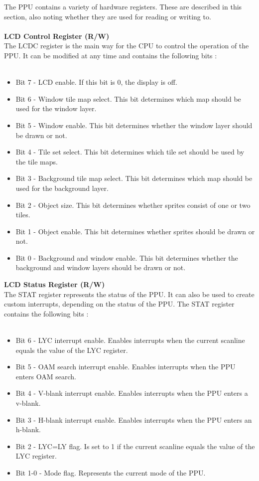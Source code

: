 The PPU contains a variety of hardware registers. These are described in this section, also noting whether they are used for reading or writing to. \\
\\
\textbf{LCD Control Register (R/W)}\\
The LCDC register is the main way for the CPU to control the operation of the PPU. It can be modified at any time and contains the following bits \cite{pandocsLCDC}:\\
\\
\begin{itemize}
    \item Bit 7 - LCD enable. If this bit is 0, the display is off.
    \item Bit 6 - Window tile map select. This bit determines which map should be used for the window layer.
    \item Bit 5 - Window enable. This bit determines whether the window layer should be drawn or not.
    \item Bit 4 - Tile set select. This bit determines which tile set should be used by the tile maps.
    \item Bit 3 - Background tile map select. This bit determines which map should be used for the background layer.
    \item Bit 2 - Object size. This bit determines whether sprites consist of one or two tiles.
    \item Bit 1 - Object enable. This bit determines whether sprites should be drawn or not.
    \item Bit 0 - Background and window enable. This bit determines whether the background and window layers should be drawn or not.
\end{itemize}

\vspace{30pt}

\textbf{LCD Status Register (R/W)}\\
The STAT register represents the status of the PPU. It can also be used to create custom interrupts, depending on the status of the PPU. The STAT register contains the following bits \cite{pandocsSTAT}:\\
\\
\begin{itemize}
    \item Bit 6 - LYC interrupt enable. Enables interrupts when the current scanline equals the value of the LYC register.
    \item Bit 5 - OAM search interrupt enable. Enables interrupts when the PPU enters OAM search.
     \item Bit 4 - V-blank interrupt enable. Enables interrupts when the PPU enters a v-blank.
    \item Bit 3 - H-blank interrupt enable. Enables interrupts when the PPU enters an h-blank.
    \item Bit 2 - LYC=LY flag. Is set to 1 if the current scanline equals the value of the LYC register.
    \item Bit 1-0 - Mode flag. Represents the current mode of the PPU.
\end{itemize}

